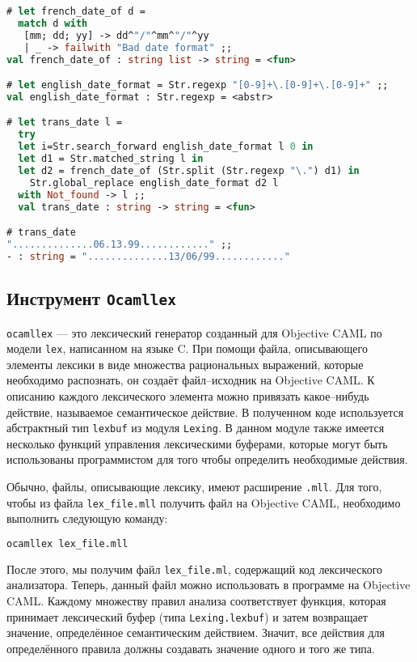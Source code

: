 \begin{lstlisting}[language=Caml]
# let french_date_of d =
  match d with
   [mm; dd; yy] -> dd^"/"^mm^"/"^yy
   | _ -> failwith "Bad date format" ;;
val french_date_of : string list -> string = <fun>

# let english_date_format = Str.regexp "[0-9]+\.[0-9]+\.[0-9]+" ;;
val english_date_format : Str.regexp = <abstr>

# let trans_date l =
  try
  let i=Str.search_forward english_date_format l 0 in
  let d1 = Str.matched_string l in
  let d2 = french_date_of (Str.split (Str.regexp "\.") d1) in
    Str.global_replace english_date_format d2 l
  with Not_found -> l ;;
  val trans_date : string -> string = <fun>

# trans_date
"..............06.13.99............" ;;
- : string = "..............13/06/99............"
\end{lstlisting}

\subsection{Инструмент \texttt{Ocamllex}}

\texttt{ocamllex} --- это лексический генератор созданный для Objective CAML по
модели \texttt{lex}, написанном на языке C. При помощи файла, описывающего
элементы лексики в виде множества рациональных выражений, которые необходимо
распознать, он создаёт файл--исходник на Objective CAML. К описанию каждого
лексического элемента можно привязать какое--нибудь действие, называемое
семантическое действие. В полученном коде используется абстрактный тип
\texttt{lexbuf} из модуля \texttt{Lexing}. В данном модуле также имеется
несколько функций управления лексическими буферами, которые могут быть
использованы программистом для того чтобы определить необходимые действия.

Обычно, файлы, описывающие лексику, имеют расширение \texttt{.mll}. Для того,
чтобы из файла \texttt{lex\_file.mll} получить файл на Objective CAML,
необходимо выполнить следующую команду:

\begin{lstlisting}[language=Caml]
ocamllex lex_file.mll
\end{lstlisting}

После этого, мы получим файл \texttt{lex\_file.ml}, содержащий код лексического
анализатора. Теперь, данный файл можно использовать в программе на Objective
CAML. Каждому множеству правил анализа соответствует функция, которая принимает
лексический буфер (типа \texttt{Lexing.lexbuf}) и затем возвращает значение,
определённое семантическим действием. Значит, все действия для определённого
правила должны создавать значение одного и того же типа.


